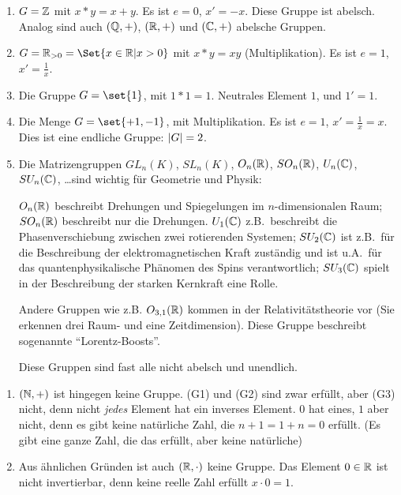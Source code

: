 \begin{example}
    \begin{enumerate}
        \item $G = \mathbb{Z}$ mit $x*y = x+y$. Es ist $e=0$, $x'=-x$. Diese Gruppe ist abelsch. Analog sind auch $(\mathbb{Q},+)$, $(\mathbb{R},+)$ und $(\mathbb{C},+)$ abelsche Gruppen.
        \item $G = \IR_{>0} = \Set{x \in \IR | x > 0 }$ mit $x*y = xy$ (Multiplikation). Es ist $e=1$, $x' = \frac{1}{x}$.
        \item Die  Gruppe $G = \set{1}$, mit $1*1 = 1$. Neutrales Element $1$, und $1' = 1$.
        \item Die Menge $G = \set{+1,-1}$, mit Multiplikation. Es ist $e=1$, $x'=\frac{1}{x}=x$. Dies ist eine endliche Gruppe: $\lvert G\rvert = 2$.
        \item Die Matrizengruppen $GL_n(K)$, $SL_n(K)$, $O_n(\mathbb{R})$, $SO_n(\mathbb{R})$, $U_n(\mathbb{C})$, $SU_n(\mathbb{C})$, \ldots sind wichtig für Geometrie und Physik:

        $O_n(\mathbb{R})$ beschreibt Drehungen und Spiegelungen im $n$-dimensionalen Raum; $SO_n(\mathbb{R})$ beschreibt nur die Drehungen. $U_1(\mathbb{C})$ z.B.\ beschreibt die Phasenverschiebung zwischen zwei rotierenden Systemen; $SU_2(\mathbb{C})$ ist z.B.\ für die Beschreibung der elektromagnetischen Kraft zuständig und ist u.A.\ für das quantenphysikalische Phänomen des Spins verantwortlich; $SU_3(\mathbb{C})$ spielt in der Beschreibung der starken Kernkraft eine Rolle.

        Andere Gruppen wie z.B. $O_{3,1}(\mathbb{R})$ kommen in der Relativitätstheorie vor (Sie erkennen drei Raum- und eine Zeitdimension). Diese Gruppe beschreibt sogenannte \enquote{Lorentz-Boosts}.

        Diese Gruppen sind fast alle nicht abelsch und unendlich.
    \end{enumerate}
\end{example}

\begin{example}
    \begin{enumerate}
        \item $(\mathbb{N},+)$ ist hingegen keine Gruppe. (G1) und (G2) sind zwar erfüllt, aber (G3) nicht, denn nicht \emph{jedes} Element hat ein inverses Element. $0$ hat eines, $1$ aber nicht, denn es gibt keine natürliche Zahl, die $n+1=1+n=0$ erfüllt. (Es gibt eine ganze Zahl, die das erfüllt, aber keine natürliche)

        \item Aus ähnlichen Gründen ist auch $(\mathbb{R},\cdot)$ keine Gruppe. Das Element $0\in\mathbb{R}$ ist nicht invertierbar, denn keine reelle Zahl erfüllt $x\cdot 0 = 1$.
    \end{enumerate}
\end{example}


